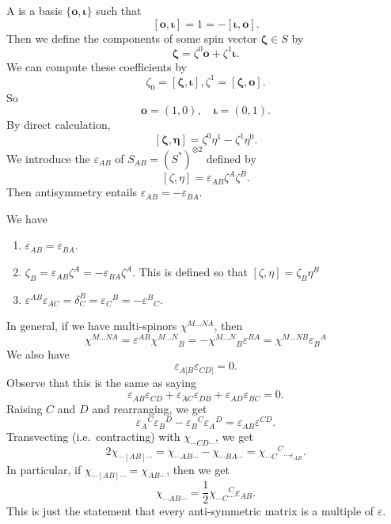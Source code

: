 \documentclass[a4paper]{article}
\newcommand\omicron{o}
\begin{document}
A  is a basis $\{\boldsymbol\omicron, \boldsymbol\iota\}$ such that
\[
  [\boldsymbol\omicron, \boldsymbol\iota] = 1 = - [\boldsymbol\iota, \boldsymbol\omicron].
\]
Then we define the components of some spin vector $\boldsymbol\zeta \in S$ by
\[
  \boldsymbol\zeta = \zeta^0 \boldsymbol\omicron + \zeta^1 \boldsymbol\iota.
\]
We can compute these coefficients by
\[
  \zeta_0 = [\boldsymbol\zeta, \boldsymbol\iota], \zeta^1 = [\boldsymbol\zeta, \boldsymbol\omicron].
\]
So
\[
  \boldsymbol\omicron = (1, 0),\quad \boldsymbol\iota = (0, 1).
\]
By direct calculation,
\[
  [\boldsymbol\zeta, \boldsymbol\eta] = \zeta^0 \eta^1 - \zeta^1 \eta^0.
\]
We introduce the  $\varepsilon_{AB}$ of $S_{AB} = (S^*)^{\otimes 2}$ defined by
\[
  [\zeta, \eta] = \varepsilon_{AB} \zeta^A \zeta^B.
\]
Then antisymmetry entails $\varepsilon_{AB} = - \varepsilon_{BA}$.
\begin{prop}
  We have
  \begin{enumerate}
    \item $\varepsilon_{AB} = \varepsilon_{BA}$.
    \item $\zeta_B = \varepsilon_{AB} \zeta^A = - \varepsilon_{BA} \zeta^A$. This is defined so that $[\zeta, \eta] = \zeta_B \eta^B$
    \item $\varepsilon^{AB} \varepsilon_{AC} = \delta^B_C = \varepsilon_C\!^B = - \varepsilon^B\!_C$.
  \end{enumerate}
\end{prop}
In general, if we have multi-spinors $\chi^{M\ldots NA}$, then
\[
  \chi^{M\ldots NA} = \varepsilon^{AB} \chi^{M\ldots N}\!_B = - \chi^{M\ldots N}\!_B \varepsilon^{BA} = \chi^{M\ldots NB} \varepsilon_B\!^A
\]
We also have
\[
  \varepsilon_{A[B} \varepsilon_{CD]} = 0.
\]
Observe that this is the same as saying
\[
  \varepsilon_{AB} \varepsilon_{CD} + \varepsilon_{AC} \varepsilon_{DB} + \varepsilon_{AD} \varepsilon_{BC} = 0.
\]
Raising $C$ and $D$ and rearranging, we get
\[
  \varepsilon_A\!^C \varepsilon_B\!^D - \varepsilon_B\!^C \varepsilon_A\!^D = \varepsilon_{AB} \varepsilon^{CD}.
\]
Transvecting (i.e.\ contracting) with $\chi_{\cdots CD \cdots}$, we get
\[
  2\chi_{\cdots [AB] \cdots} = \chi_{\cdots AB \cdots} - \chi_{\cdots BA \cdots } = \chi_{\cdots C}\!^C \!_{\cdots \varepsilon_{AB}}.
\]
In particular, if $\chi_{\cdots [AB]\cdots} = \chi_{AB \cdots}$, then we get
\[
  \chi_{\cdots AB \cdots} = \frac{1}{2} \chi_{\cdots C}\!^C_{\cdots} \varepsilon_{AB}.
\]
This is just the statement that every anti-symmetric matrix is a multiple of $\varepsilon$.
\end{document}
